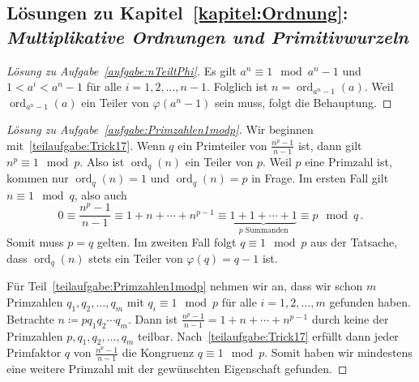 \subsection*{Lösungen zu Kapitel~\ref{kapitel:Ordnung}: \emph{Multiplikative Ordnungen und Primitivwurzeln}}
\begin{proof}[Lösung zu Aufgabe~\ref{aufgabe:nTeiltPhi}]
	Es gilt $a^n\equiv 1\mod a^n-1$ und $1<a^i<a^n-1$ für alle $i=1,2,\dotsc,n-1$. Folglich ist $n=\operatorname{ord}_{a^n-1}(a)$. Weil $\operatorname{ord}_{a^n-1}(a)$ ein Teiler von $\varphi(a^n-1)$ sein muss, folgt die Behauptung.
\end{proof}

\begin{proof}[Lösung zu Aufgabe~\ref{aufgabe:Primzahlen1modp}]
	Wir beginnen mit~\ref{teilaufgabe:Trick17}. Wenn $q$ ein Primteiler von $\frac{n^p-1}{n-1}$ ist, dann gilt $n^p\equiv 1\mod p$. Also ist $\operatorname{ord}_q(n)$ ein Teiler von $p$. Weil $p$ eine Primzahl ist, kommen nur $\operatorname{ord}_q(n)=1$ und $\operatorname{ord}_q(n)=p$ in Frage. Im ersten Fall gilt $n\equiv 1\mod q$, also auch
	\begin{equation*}
		0\equiv \frac{n^p-1}{n-1}\equiv 1+n+\dotsb+n^{p-1}\equiv \underbrace{1+1+\dotsb+1}_{\text{$p$ Summanden}}\equiv p\mod q\,.
	\end{equation*}
	Somit muss $p=q$ gelten. Im zweiten Fall folgt $q\equiv 1\mod p$ aus der Tatsache, dass $\operatorname{ord}_q(n)$ stets ein Teiler von $\varphi(q)=q-1$ ist.
	
	Für Teil~\ref{teilaufgabe:Primzahlen1modp} nehmen wir an, dass wir schon $m$ Primzahlen $q_1,q_2,\dotsc,q_m$ mit $q_i\equiv 1\mod p$ für alle $i=1,2,\dotsc,m$ gefunden haben. Betrachte $n\coloneqq pq_1q_2\dotsm q_m$. Dann ist $\frac{n^p-1}{n-1}=1+n+\dotsb+n^{p-1}$ durch keine der Primzahlen $p,q_1,q_2,\dotsc,q_m$ teilbar. Nach~\ref{teilaufgabe:Trick17} erfüllt dann jeder Primfaktor $q$ von $\frac{n^p-1}{n-1}$ die Kongruenz $q\equiv 1\mod p$. Somit haben wir mindestens eine weitere Primzahl mit der gewünschten Eigenschaft gefunden.
\end{proof}

